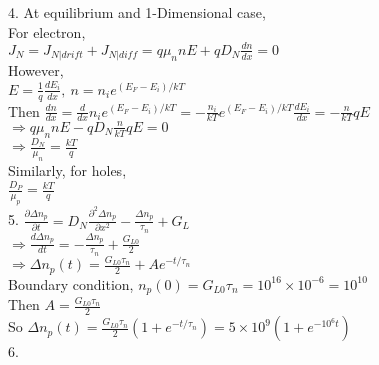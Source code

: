 \documentclass[11pt,oneside,a4paper]{article}
\begin{document}
4.\: At equilibrium and 1-Dimensional case, \\

\quad\:  For electron, \\

\hspace{8.5mm} \(J_N=J_{N|drift}+J_{N|diff}=q\mu_nnE+qD_N\frac{dn}{dx}=0\) \\

\quad\: However, \\

\hspace{8.5mm} \(E=\frac{1}{q}\frac{dE_i}{dx},\ n=n_ie^{(E_F-E_i)/kT}\) \\

\quad\: Then \(\frac{dn}{dx}=\frac{d}{dx}n_ie^{(E_F-E_i)/kT}=-\frac{n_i}{kT}e^{(E_F-E_i)/kT}\frac{dE_i}{dx}=-\frac{n}{kT}qE\) \\

\hspace{8.5mm} \(\Rightarrow q\mu_nnE-qD_N\frac{n}{kT}qE=0\) \\

\hspace{8.5mm} \(\Rightarrow\frac{D_N}{\mu_n}=\frac{kT}{q}\) \\

\quad\: Similarly, for holes, \\

\hspace{8.5mm} \(\frac{D_P}{\mu_p}=\frac{kT}{q}\) \\

5.\: \(\frac{\partial\Delta n_p}{\partial t}=D_N\frac{\partial^2\Delta n_p}{\partial x^2}-\frac{\Delta n_p}{\tau_n}+G_L\) \\

\quad\: \(\Rightarrow\frac{d\Delta n_p}{dt}=-\frac{\Delta n_p}{\tau_n}+\frac{G_{L0}}{2}\) \\

\quad\: \(\Rightarrow\Delta n_p(t)=\frac{G_{L0}\tau_n}{2}+Ae^{-t/\tau_n}\) \\

\quad\: Boundary condition, \(n_p(0)=G_{L0}\tau_n=10^{16}\times10^{-6}=10^{10}\) \\

\quad\: Then \(A=\frac{G_{L0}\tau_n}{2}\) \\

\quad\: So \(\Delta n_p(t)=\frac{G_{L0}\tau_n}{2}(1+e^{-t/\tau_n})=5\times10^9(1+e^{-10^6t})\) \\

6.\: \(\) \\
\end{document}
